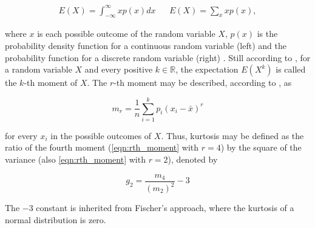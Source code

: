 \begin{align}
\label{eqn:expectation}
E(X) = \int_{-\infty}^{\infty} x p(x)dx
&&
E(X) = \sum_{x} x p(x),
\end{align}

\noindent where $x$ is each possible outcome of the random variable $X$, $p(x)$ is the probability density function for a continuous random variable (left) and the probability function for a discrete random variable (right) \cite{degroot2012probability}. Still according to , for a random variable $X$ and every positive $k \in \mathbb{R}$, the expectation $E(X^{k})$ is
called the $k$-th moment of $X$. The $r$-th moment may be described, according to , as

\begin{equation}
\label{eqn:rth_moment}
m_{r} = \frac{1}{n}
        \sum_{i=1}^{k}p_{i}(x_{i} - \bar{x})^{r}
\end{equation}

\noindent for every $x_{i}$ in the possible outcomes of $X$. Thus, kurtosis may be defined as the ratio of the fourth moment (\autoref{eqn:rth_moment} with $r = 4$) by the square of the variance (also \autoref{eqn:rth_moment} with $r = 2$), denoted by

\begin{equation}
\label{eqn:kurtosis}
g_{2} = \frac{m_{4}}{(m_{2})^{2}} - 3
\end{equation}

The $-3$ constant is inherited from Fischer's approach, where the kurtosis of a normal distribution is zero.